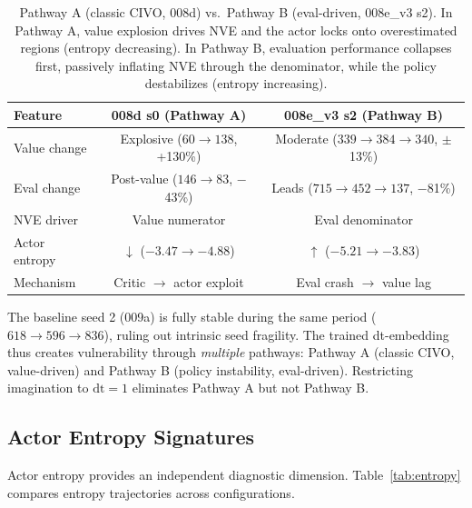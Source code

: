\documentclass[10pt,letterpaper]{article}
\begin{document}
\begin{table}[h]
\centering
\caption{Pathway A (classic CIVO, 008d) vs.\ Pathway B (eval-driven, 008e\_v3 s2). In Pathway A, value explosion drives NVE and the actor locks onto overestimated regions (entropy decreasing). In Pathway B, evaluation performance collapses first, passively inflating NVE through the denominator, while the policy destabilizes (entropy increasing).}
\label{tab:pathways}
\small
\begin{tabular}{lcc}
\toprule
Feature & 008d s0 (Pathway A) & 008e\_v3 s2 (Pathway B) \\
\midrule
Value change & Explosive ($60\to138$, +130\%) & Moderate ($339\to384\to340$, $\pm$13\%) \\
Eval change & Post-value ($146\to83$, $-$43\%) & Leads ($715\to452\to137$, $-$81\%) \\
NVE driver & Value numerator & Eval denominator \\
Actor entropy & $\downarrow$ ($-3.47\to-4.88$) & $\uparrow$ ($-5.21\to-3.83$) \\
Mechanism & Critic $\to$ actor exploit & Eval crash $\to$ value lag \\
\bottomrule
\end{tabular}
\end{table}

The baseline seed 2 (009a) is fully stable during the same period ($618\to596\to836$), ruling out intrinsic seed fragility.
The trained dt-embedding thus creates vulnerability through \emph{multiple} pathways: Pathway A (classic CIVO, value-driven) and Pathway B (policy instability, eval-driven).
Restricting imagination to $\mathrm{dt}=1$ eliminates Pathway A but not Pathway B.

\subsection{Actor Entropy Signatures}

Actor entropy provides an independent diagnostic dimension.
Table~\ref{tab:entropy} compares entropy trajectories across configurations.
\end{document}
